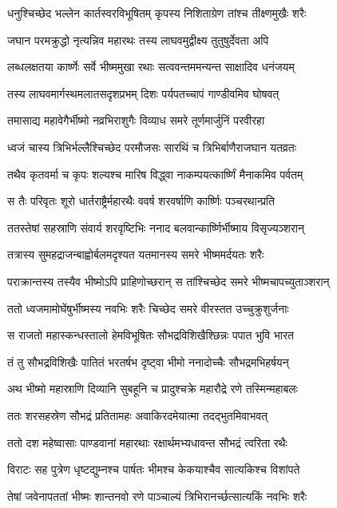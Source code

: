 \twolineshloka
{धनुश्चिच्छेद भल्लेन कार्तस्वरविभूषितम्}
{कृपस्य निशिताग्रेण तांश्च तीक्ष्णमुखैः शरैः}


\twolineshloka
{जघान परमक्रुद्धो नृत्यन्निव महारथः}
{तस्य लाघवमुद्वीक्ष्य तुतुषुर्देवता अपि}


\twolineshloka
{लब्धलक्षतया कार्ष्णेः सर्वे भीष्ममुखा रथाः}
{सत्ववन्तममन्यन्त साक्षादिव धनंजयम्}


\twolineshloka
{तस्य लाघवमार्गस्थमलातसदृशप्रभम्}
{दिशः पर्यपतच्चापं गाण्डीवमिव घोषवत्}


\twolineshloka
{तमासाद्य महावेगैर्भीष्मो नव्रभिराशुगैः}
{विव्याध समरे तूर्णमार्जुनिं परवीरहा}


\twolineshloka
{ध्वजं चास्य त्रिभिर्भल्लैश्चिच्छेद परमौजसः}
{सारथिं च त्रिभिर्बाणैराजघान यतव्रतः}


\twolineshloka
{तथैव कृतवर्मा च कृपः शल्यश्च मारिष}
{विद्ध्वा नाकम्पयत्कार्ष्णिं मैनाकमिव पर्वतम्}


\twolineshloka
{स तैः परिवृतः शूरो धार्तराष्ट्रैर्महारथैः}
{ववर्ष शरवर्षाणि कार्ष्णिः पञ्चरथान्प्रति}


\twolineshloka
{ततस्तेषां सहस्राणि संवार्य शरवृष्टिभिः}
{ननाद बलवान्कार्ष्णिर्भीष्माय विसृज्यञ्शरान्}


\twolineshloka
{तत्रास्य सुमहद्राजन्बाह्वोर्बलमदृश्यत}
{यतमानस्य समरे भीष्ममर्दयतः शरैः}


\twolineshloka
{पराक्रान्तस्य तस्यैव भीष्मोऽपि प्राहिणोच्छरान्}
{स तांश्चिच्छेद समरे भीष्मचापच्युताञ्शरान्}


\twolineshloka
{ततो ध्वजमामोघेंषुर्भीष्मस्य नवभिः शरैः}
{चिच्छेद समरे वीरस्तत उच्चुक्रुशुर्जनाः}


\twolineshloka
{स राजतो महास्कन्धस्तालो हेमविभूषितः}
{सौभद्रविशिखैश्छिन्नः पपात भुवि भारत}


\twolineshloka
{तं तु सौभद्रविशिखैः पातितं भरतर्षभ}
{दृष्ट्वा भीमो ननादोच्चैः सौभद्रमभिहर्षयन्}


\twolineshloka
{अथ भीष्मो महास्राणि दिव्यानि सुबहूनि च}
{प्रादुश्चक्रे महारौद्रे रणे तस्मिन्महाबलः}


\twolineshloka
{ततः शरसहस्रेण सौभद्रं प्रतितामहः}
{अवाकिरदमेयात्मा तदद्भुतमिवाभवत्}


\twolineshloka
{ततो दश महेष्वासाः पाण्डवानां महारथाः}
{रक्षार्थमभ्यधावन्त सौभद्रं त्वरिता रथैः}


\twolineshloka
{विराटः सह पुत्रेण धृष्टद्युम्नश्च पार्षतः}
{भीमश्च केकयाश्चैव सात्यकिश्च विशांपते}


\threelineshloka
{तेषां जवेनापततां भीष्मः शान्तनवो रणे}
{पाञ्चाल्यं त्रिभिरानर्च्छत्सात्यकिं नवभिः शरैः}
{}


